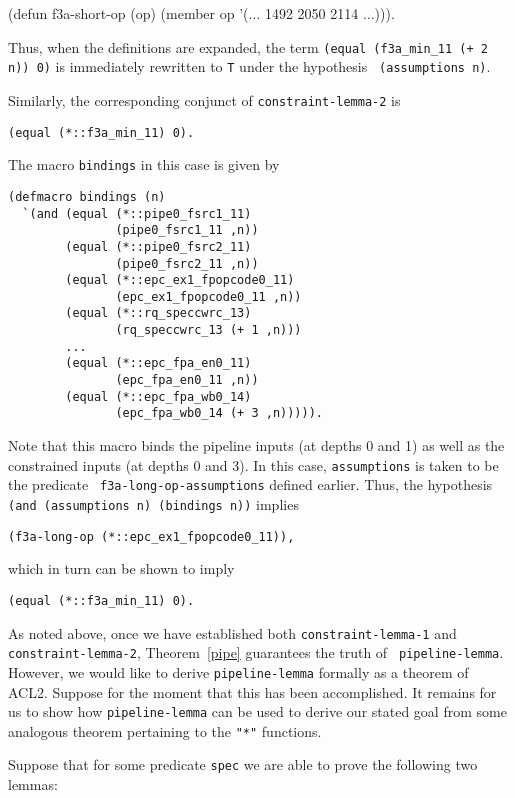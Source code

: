 \documentclass{article}
\begin{document}
\begin{acl2}
(defun f3a-short-op (op)
  (member op '($\ldots$ 1492 2050 2114 $\ldots$))).
\end{acl2}\noindent
Thus, when the definitions are expanded, the term {\tt (equal (f3a\_min\_11 (+ 2
n)) 0)} is immediately rewritten to {\tt T} under the hypothesis {\tt
(assumptions n)}.

Similarly, the corresponding conjunct of {\tt constraint-lemma-2} is
\begin{verbatim}
(equal (*::f3a_min_11) 0).
\end{verbatim}
The macro {\tt bindings} in this case is given by
\begin{verbatim}
(defmacro bindings (n)
  `(and (equal (*::pipe0_fsrc1_11)
               (pipe0_fsrc1_11 ,n))
        (equal (*::pipe0_fsrc2_11)
               (pipe0_fsrc2_11 ,n))
        (equal (*::epc_ex1_fpopcode0_11)
               (epc_ex1_fpopcode0_11 ,n))
        (equal (*::rq_speccwrc_13)
               (rq_speccwrc_13 (+ 1 ,n)))
        ...
        (equal (*::epc_fpa_en0_11)
               (epc_fpa_en0_11 ,n))
        (equal (*::epc_fpa_wb0_14)
               (epc_fpa_wb0_14 (+ 3 ,n))))).
\end{verbatim}
Note that this macro binds the pipeline inputs (at depths 0 and 1) as
well as the constrained inputs (at depths 0 and 3).  In this case,
{\tt assumptions} is taken to be the predicate {\tt
f3a-long-op-assumptions} defined earlier.  Thus, the hypothesis {\tt
(and (assumptions n) (bindings n))} implies

\begin{verbatim}
(f3a-long-op (*::epc_ex1_fpopcode0_11)),
\end{verbatim}
which in turn can be shown to imply

\begin{verbatim}
(equal (*::f3a_min_11) 0).
\end{verbatim}

As noted above, once we have established both {\tt constraint-lemma-1} and {\tt
constraint-}{\tt lemma-2}, Theorem~\ref{pipe} guarantees the truth of {\tt
pipeline-lemma}.  However, we would like to derive {\tt pipeline-lemma}
formally as a theorem of ACL2.  Suppose for the moment that this has been
accomplished. It remains for us to show how {\tt pipeline-lemma} can be used to
derive our stated goal from some analogous theorem pertaining to the \verb!"*"!
functions.

Suppose that for some predicate {\tt spec} we are able to prove
the following two lemmas:\medskip
\end{document}
